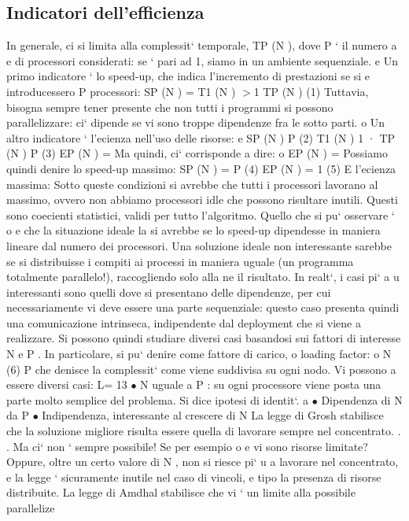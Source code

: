 \documentclass[a4paper,12pt]{article}
\begin{document}
\subsection{Indicatori dell'efficienza}
In generale, ci si limita alla complessit` temporale, TP (N ), dove P ` il numero
a
e
di processori considerati: se ` pari ad 1, siamo in un ambiente sequenziale.
e
Un primo indicatore ` lo speed-up, che indica l'incremento di prestazioni se si
e
introducessero P processori:
SP (N ) =
T1 (N )
$>$1
TP (N )
(1)
Tuttavia, bisogna sempre tener presente che non tutti i programmi si possono
parallelizzare: ci` dipende se vi sono troppe dipendenze fra le sotto parti.
o
Un altro indicatore ` l'ecienza nell'uso delle risorse:
e
SP (N )
P
(2)
T1 (N ) 1
·
TP (N ) P
(3)
EP (N ) =
Ma quindi, ci` corrisponde a dire:
o
EP (N ) =
Possiamo quindi denire lo speed-up massimo:
SP (N ) = P
(4)
EP (N ) = 1
(5)
E l'ecienza massima:
Sotto queste condizioni si avrebbe che tutti i processori lavorano al massimo,
ovvero non abbiamo processori idle che possono risultare inutili. Questi sono
coecienti statistici, validi per tutto l'algoritmo. Quello che si pu` osservare `
o
e
che la situazione ideale la si avrebbe se lo speed-up dipendesse in maniera lineare dal numero dei processori. Una
soluzione ideale non interessante sarebbe
se si distribuisse i compiti ai processi in maniera uguale (un programma totalmente parallelo!), raccogliendo solo alla
ne il risultato. In realt`, i casi pi`
a
u
interessanti sono quelli dove si presentano delle dipendenze, per cui necessariamente vi deve essere una parte
sequenziale: questo caso presenta quindi una
comunicazione intrinseca, indipendente dal deployment che si viene a realizzare.
Si possono quindi studiare diversi casi basandosi sui fattori di interesse N e
P . In particolare, si pu` denire come fattore di carico, o loading factor:
o
N
(6)
P
che denisce la complessit` come viene suddivisa su ogni nodo. Vi possono
a
essere diversi casi:
L=
13
$\bullet$ N uguale a P : su ogni processore viene posta una parte molto semplice
del problema. Si dice ipotesi di identit`.
a
$\bullet$ Dipendenza di N da P
$\bullet$ Indipendenza, interessante al crescere di N
La legge di Grosh stabilisce che la soluzione migliore risulta essere quella di lavorare sempre nel concentrato. . . Ma
ci` non ` sempre possibile! Se per esempio
o
e
vi sono risorse limitate? Oppure, oltre un certo valore di N , non si riesce pi`
u
a lavorare nel concentrato, e la legge ` sicuramente inutile nel caso di vincoli,
e
tipo la presenza di risorse distribuite.
La legge di Amdhal stabilisce che vi ` un limite alla possibile parallelize
\end{document}
